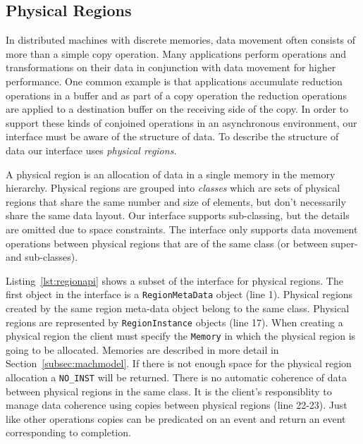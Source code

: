 \subsection{Physical Regions}
\label{subsec:phyreg}
In distributed machines with discrete memories, data movement often consists of more
than a simple copy operation.  Many applications perform operations and transformations on
their data in conjunction with data movement for higher performance.  One common example is 
that applications accumulate reduction operations in a buffer and as part of a copy operation 
the reduction operations are applied to a destination buffer on the receiving side of the copy.  
In order to support these kinds of conjoined operations in an asynchronous environment, our interface 
must be aware of the structure of data.  To describe the structure of data our interface 
uses {\em physical regions.}

A physical region is an allocation of data in a single memory in the memory hierarchy.  Physical
regions are grouped into {\em classes} which are sets of physical regions that share the
same number and size of elements, but don't necessarily share the same data layout.  Our
interface supports sub-classing, but the details are omitted due to space constraints.  The
interface only supports data movement operations between physical regions that are of
the same class (or between super- and sub-classes).

Listing~\ref{lst:regionapi} shows a subset of the interface for physical regions.  The
first object in the interface is a {\tt RegionMetaData} object (line 1).  Physical
regions created by the same region meta-data object belong to the same class.  Physical
regions are represented by {\tt RegionInstance} objects (line 17).  When creating a physical
region the client must specify the {\tt Memory} in which the physical region is going
to be allocated.  Memories are described in more detail in Section~\ref{subsec:machmodel}.
If there is not enough space for the physical region allocation a {\tt NO\_INST} will
be returned.  There is no automatic coherence of data between physical regions in the
same class.  It is the client's responsiblity to manage data coherence using copies
between physical regions (line 22-23).  Just like other operations copies can be
predicated on an event and return an event corresponding to completion.

